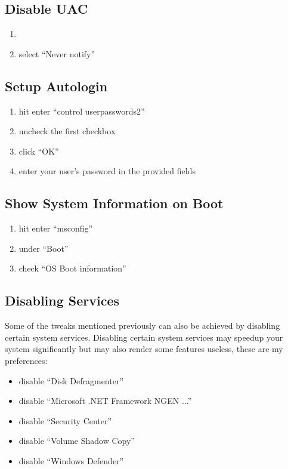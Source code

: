 \documentclass{itsarticle}
\begin{document}
\subsection{Disable UAC}
\label{sub:disable_uac}

\begin{enumerate}
    \item {}
    \item select ``Never notify''
\end{enumerate}

\subsection{Setup Autologin}
\label{sub:setup_autologin}

\begin{enumerate}
    \item hit  enter ``control userpasswords2''
    \item uncheck the first checkbox
    \item click ``OK''
    \item enter your user's password in the provided fields
\end{enumerate}

\subsection{Show System Information on Boot}
\label{sub:show_system_information_on_boot}

\begin{enumerate}
    \item hit  enter ``msconfig''
    \item under ``Boot''
    \item check ``OS Boot information''
\end{enumerate}

\subsection{Disabling Services}
\label{sub:services}

Some of the tweaks mentioned previously can also be achieved by disabling
certain system services. Disabling certain system services may speedup your
system significantly but may also render some features useless, these are my
preferences:

\begin{itemize}
    \item disable ``Disk Defragmenter''
    \item disable ``Microsoft .NET Framework NGEN ...''
    \item disable ``Security Center''
    \item disable ``Volume Shadow Copy''
    \item disable ``Windows Defender''
\end{itemize}
\end{document}
